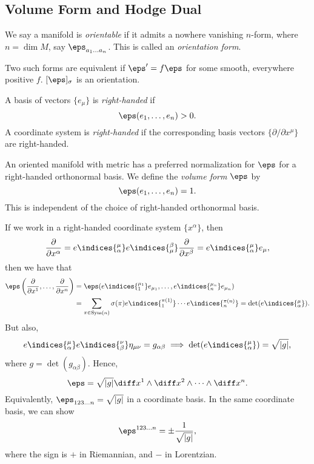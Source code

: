 \documentclass[12pt]{article}
\begin{document}
\subsection{Volume Form and Hodge Dual}%
\label{sub:vfhd}

We say a manifold is \emph{orientable} if it admits a nowhere vanishing $n$-form, where $n = \dim M$, say $\eps_{a_1 \ldots a_n}$. This is called an \emph{orientation form}.

Two such forms are equivalent if $\eps' = f \eps$ for some smooth, everywhere positive $f$. $[\eps]_\sigma$ is an orientation.

A basis of vectors $\{e_\mu\}$ is \emph{right-handed} if
\[
\eps(e_1, \ldots, e_n) > 0.
\]
A coordinate system is \emph{right-handed} if the corresponding basis vectors $\{ \partial/\partial x^\mu\}$ are right-handed.


An oriented manifold with metric has a preferred normalization for $\eps$ for a right-handed orthonormal basis. We define the \emph{volume form} $\eps$ by
\[
\eps(e_1, \ldots, e_n) = 1.
\]
This is independent of the choice of right-handed orthonormal basis.

If we work in a right-handed coordinate system $\{x^\alpha\}$, then
\[
\frac{\partial}{\partial x^\alpha} = e\indices{_{\alpha}^\mu} e\indices{^{\beta}_{\mu}} \frac{\partial}{\partial x^\beta} = e\indices{_{\alpha}^\mu}e_\mu,
\]
then we have that
\begin{align*}
	\eps \left( \frac{\partial}{\partial x^1}, \ldots, \frac{\partial}{\partial x^n} \right) &= \eps (e\indices{_{1}^{\mu_1}} e_{\mu_1}, \ldots, e\indices{_{n}^{\mu_n}} e_{\mu_n} ) \\
												 &= \sum_{\pi \in \mathrm{Sym}(n)} \sigma(\pi) e\indices{_{1}^{\pi(1)}} \cdots e\indices{_{n}^{\pi(n)}} = \det (e\indices{_{\alpha}^\mu}).
\end{align*}
But also,
\[
	e\indices{_{\alpha}^\mu} e\indices{_{\beta}^\nu} \eta_{\mu\nu} = g_{\alpha\beta} \implies \det( e \indices{_{\alpha}^\mu} ) = \sqrt{|g|},
\]
where $g = \det (g_{\alpha\beta})$. Hence,
\[
	\eps = \sqrt{|g|} \diff x^1 \wedge \diff x^2 \wedge \cdots \wedge \diff x^n.
\]
Equivalently, $\eps_{123\ldots n} = \sqrt{|g|}$ in a coordinate basis. In the same coordinate basis, we can show
\[
	\eps^{123\ldots n} = \pm \frac{1}{\sqrt{|g|}},
\]
where the sign is $+$ in Riemannian, and $-$ in Lorentzian.
\end{document}
